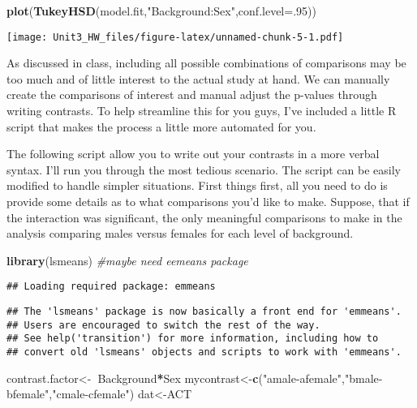 \documentclass[]{article}
\newenvironment{Shaded}{\begin{snugshade}}{\end{snugshade}}
\newcommand{\CommentTok}[1]{\textcolor[rgb]{0.56,0.35,0.01}{\textit{#1}}}
\newcommand{\DataTypeTok}[1]{\textcolor[rgb]{0.13,0.29,0.53}{#1}}
\newcommand{\DecValTok}[1]{\textcolor[rgb]{0.00,0.00,0.81}{#1}}
\newcommand{\ErrorTok}[1]{\textcolor[rgb]{0.64,0.00,0.00}{\textbf{#1}}}
\newcommand{\KeywordTok}[1]{\textcolor[rgb]{0.13,0.29,0.53}{\textbf{#1}}}
\newcommand{\NormalTok}[1]{#1}
\newcommand{\OperatorTok}[1]{\textcolor[rgb]{0.81,0.36,0.00}{\textbf{#1}}}
\newcommand{\StringTok}[1]{\textcolor[rgb]{0.31,0.60,0.02}{#1}}
\begin{document}
\begin{Shaded}
\begin{Highlighting}[]
\KeywordTok{plot}\NormalTok{(}\KeywordTok{TukeyHSD}\NormalTok{(model.fit,}\StringTok{"Background:Sex"}\NormalTok{,}\DataTypeTok{conf.level=}\NormalTok{.}\DecValTok{95}\NormalTok{))}
\end{Highlighting}
\end{Shaded}

\texttt{[image: Unit3\_HW\_files/figure-latex/unnamed-chunk-5-1.pdf]}

As discussed in class, including all possible combinations of
comparisons may be too much and of little interest to the actual study
at hand. We can manually create the comparisons of interest and manual
adjust the p-values through writing contrasts. To help streamline this
for you guys, I've included a little R script that makes the process a
little more automated for you.

The following script allow you to write out your contrasts in a more
verbal syntax. I'll run you through the most tedious scenario. The
script can be easily modified to handle simpler situations. First things
first, all you need to do is provide some details as to what comparisons
you'd like to make. Suppose, that if the interaction was significant,
the only meaningful comparisons to make in the analysis comparing males
versus females for each level of background.

\begin{Shaded}
\begin{Highlighting}[]
\KeywordTok{library}\NormalTok{(lsmeans) }\CommentTok{#maybe need eemeans package}
\end{Highlighting}
\end{Shaded}

\begin{verbatim}
## Loading required package: emmeans
\end{verbatim}

\begin{verbatim}
## The 'lsmeans' package is now basically a front end for 'emmeans'.
## Users are encouraged to switch the rest of the way.
## See help('transition') for more information, including how to
## convert old 'lsmeans' objects and scripts to work with 'emmeans'.
\end{verbatim}

\begin{Shaded}
\begin{Highlighting}[]
\NormalTok{contrast.factor<-}\ErrorTok{~}\NormalTok{Background}\OperatorTok{*}\NormalTok{Sex}
\NormalTok{mycontrast<-}\KeywordTok{c}\NormalTok{(}\StringTok{"amale-afemale"}\NormalTok{,}\StringTok{"bmale-bfemale"}\NormalTok{,}\StringTok{"cmale-cfemale"}\NormalTok{)}
\NormalTok{dat<-ACT}
\end{Highlighting}
\end{Shaded}
\end{document}
